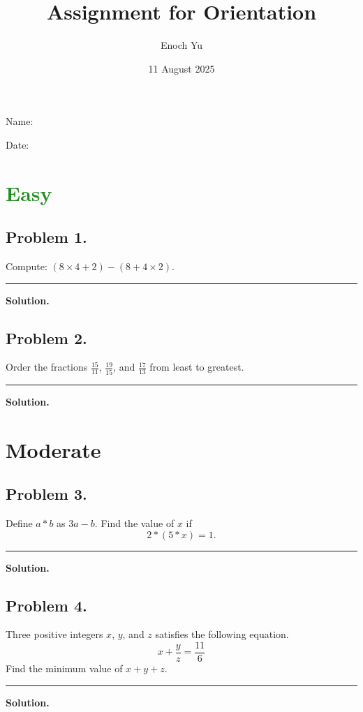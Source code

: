 \documentclass{article}
\title{Assignment for Orientation}
\author{Enoch Yu}
\date{11 August 2025}
\newcommand {\MyLine} {
    \smallskip \noindent\rule{\textwidth}{0.4pt} \smallskip
}
\begin{document}
Name:

Date:

\section*{\textcolor{ForestGreen}{Easy}}
\begin{minipage}[t][0.4\textheight][t]{\textwidth}
\subsection*{Problem 1.} %
{\color {Gray}
Compute: $(8 \times 4 + 2) - (8 + 4 \times 2)$.
}

\MyLine

\textbf{Solution.}

\end{minipage}


\begin{minipage}[t][0.4\textheight][t]{\textwidth}
\subsection*{Problem 2.} %
{\color {Gray}
Order the fractions $\frac{15}{11}$, $\frac{19}{15}$,
and $\frac{17}{13}$ from least to greatest.
}

\MyLine

\textbf{Solution.}

\end{minipage}


\newpage
\section*{\textcolor{YellowOrange}{Moderate}}
\begin{minipage}[t][0.45\textheight][t]{\textwidth}
\subsection*{Problem 3.} %
{\color {Gray}
Define $a * b$ as $3a - b$. Find the value of $x$ if
\[
2 * (5 * x) = 1.
\]
}

\MyLine

\textbf{Solution.}

\end{minipage}

\begin{minipage}[t][0.45\textheight][t]{\textwidth}

\subsection*{Problem 4.} %
{\color {Gray}
Three positive integers $x$, $y$, and $z$ satisfies
the following equation.
\[
x + \frac{y}{z} = \frac{11}{6}
\]
Find the minimum value of $x + y + z$.
}

\MyLine

\textbf{Solution.}

\end{minipage}
\end{document}
